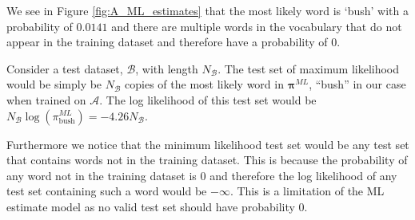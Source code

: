 \documentclass[11pt]{article}
\begin{document}
We see in Figure \ref{fig:A_ML_estimates} that the most likely word is `bush' with a probability of $0.0141$ and there are multiple words in the vocabulary that do not appear in the training dataset and therefore have a probability of $0$. 

Consider a test dataset, $\mathcal{B}$, with length $N_{\mathcal{B}}$. The test set of maximum likelihood would be simply be $N_{\mathcal{B}}$ copies of the most likely word in $\boldsymbol{\pi}^{ML}$, ``bush'' in our case when trained on $\mathcal{A}$. The log likelihood of this test set would be $N_{\mathcal{B}} \log(\pi_{\text{bush}}^{ML}) = -4.26 N_{\mathcal{B}}$.

Furthermore we notice that the minimum likelihood test set would be any test set that contains words not in the training dataset. This is because the probability of any word not in the training dataset is $0$ and therefore the log likelihood of any test set containing such a word would be $-\infty$. This is a limitation of the ML estimate model as no valid test set should have probability $0$.
\end{document}
